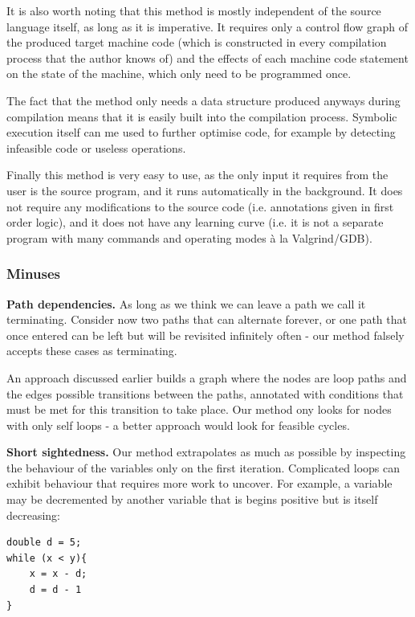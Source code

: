 \documentclass[12pt,a4paper]{article}
\begin{document}
It is also worth noting that this method is mostly independent of the source language itself, as long as it is imperative. It requires only a control flow graph of the produced target machine code (which is
constructed in every compilation process that the author knows of) and the effects of each machine code statement on the state of the machine, which only need to be programmed once.

The fact that the method only needs a data structure produced anyways during compilation means that it is easily built into the compilation process. Symbolic execution
itself can me used to further optimise code, for example by detecting infeasible code or useless operations.

Finally this method is very easy to use, as the only input it requires from the user is the source program, and it runs automatically in the background. It does
not require any modifications to the source code (i.e. annotations given in first order logic), and it does not have any learning curve (i.e. it is not a separate
program with many commands and operating modes \`a la Valgrind/GDB). 

\subsubsection{Minuses}
\textbf{Path dependencies.} As long as we think we can leave a path we call it terminating. Consider now two paths that can alternate forever, or
one path that once entered can be left but will be revisited infinitely often - our method falsely accepts these cases as terminating.

An approach discussed earlier \citep{loopster} builds a graph where the nodes are loop paths and the edges possible transitions between the paths, annotated with
conditions that must be met for this transition to take place. Our method ony looks for nodes with only self loops - a better approach would look for feasible cycles.

\textbf{Short sightedness.} Our method extrapolates as much as possible by inspecting the behaviour of the variables only on the first iteration. Complicated loops can exhibit behaviour that requires more work to uncover. For example, a variable may be decremented by another variable that is begins positive but is itself
decreasing:

\begin{center}
\begin{minipage}{5.5cm}
\begin{lstlisting}[language=myLang, frame=tlrb, numbers=none, label={lst:termin}, linewidth=5cm]
double d = 5;
while (x < y){
	x = x - d;
	d = d - 1
}
\end{lstlisting}
\end{minipage}
\end{center}
\end{document}
